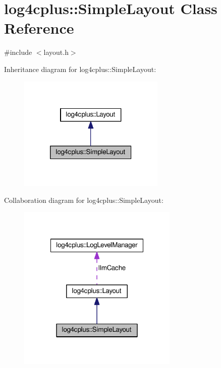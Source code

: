 \hypertarget{classlog4cplus_1_1SimpleLayout}{\section{log4cplus\-:\-:Simple\-Layout Class Reference}
\label{classlog4cplus_1_1SimpleLayout}
}


{\ttfamily \#include $<$layout.\-h$>$}



Inheritance diagram for log4cplus\-:\-:Simple\-Layout\-:
\nopagebreak
\begin{figure}[H]
\begin{center}
\leavevmode
\includegraphics[width=198pt]{classlog4cplus_1_1SimpleLayout__inherit__graph}
\end{center}
\end{figure}


Collaboration diagram for log4cplus\-:\-:Simple\-Layout\-:
\nopagebreak
\begin{figure}[H]
\begin{center}
\leavevmode
\includegraphics[width=216pt]{classlog4cplus_1_1SimpleLayout__coll__graph}
\end{center}
\end{figure}
